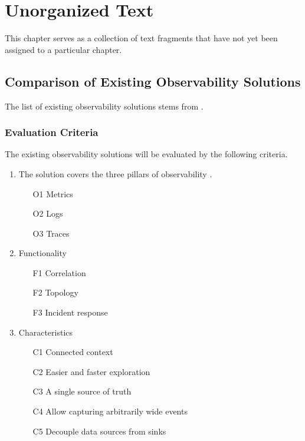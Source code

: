 \chapter{Unorganized Text}


This chapter serves as a collection of text fragments that have not yet been assigned to a particular chapter.

\section{Comparison of Existing Observability Solutions}

The list of existing observability solutions stems from \cite{9837035}.

\subsection{Evaluation Criteria}

The existing observability solutions will be evaluated by the following criteria.
\begin{enumerate}
    \item The solution covers the three pillars of observability \cite{9837035}.
    \begin{itemize}
        \item[O1]  Metrics
        \item[O2] Logs
        \item[O3] Traces
    \end{itemize}
    \item Functionality
    \begin{itemize}
        \item[F1] Correlation
        \item[F2] Topology
        \item[F3] Incident response
    \end{itemize}
    \item Characteristics
    \begin{itemize}
        \item[C1] Connected context
        \item[C2] Easier and faster exploration
        \item[C3] A single source of truth
        \item[C4] Allow capturing arbitrarily wide events
        \item[C5] Decouple data sources from sinks
    \end{itemize}
\end{enumerate}

